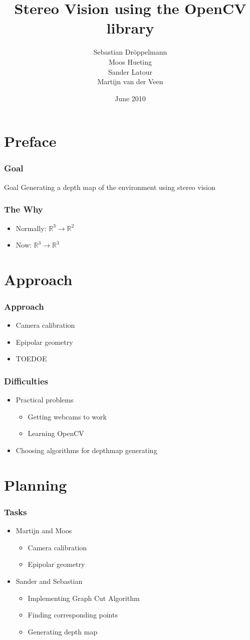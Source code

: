 \documentclass{beamer}
\title[Stereo vision]{Stereo Vision using the OpenCV library}
\author[Dr\"oppelmann \and Hueting \and Latour \and \\Van der Veen]{Sebastian Dr\"oppelmann \\ Moos Hueting \\ Sander Latour \\ Martijn van der Veen}
\institute{University of Amsterdam}
\date{June 2010}
\begin{document}
\frame
{
  \titlepage
}

\section{Preface}

\frame
{
 \frametitle{Goal}
 \begin{block}{Goal}
   Generating a depth map of the environment using stereo vision
 \end{block}
}

\frame
{
  \frametitle{The Why}
  \begin{itemize}
    \item Normally: $\mathbb{R}^3 \rightarrow \mathbb{R}^2$
    \item Now: $\mathbb{R}^3 \rightarrow \mathbb{R}^3$
  \end{itemize}
}

\section{Approach}

\frame
{
  \frametitle{Approach}
  \begin{itemize}
    \item Camera calibration
    \item Epipolar geometry
    \item TOEDOE
  \end{itemize}
}

\frame
{
  \frametitle{Difficulties}
  \begin{itemize}
    \item Practical problems
    \begin{itemize}
      \item Getting webcams to work
      \item Learning OpenCV
    \end{itemize}
    \item Choosing algorithms for depthmap generating
  \end{itemize}
}

\section{Planning}

\frame
{
  \frametitle{Tasks}
  \begin{itemize}
    \item Martijn and Moos
    \begin{itemize}
      \item Camera calibration
      \item Epipolar geometry
    \end{itemize}

    \item Sander and Sebastian
    \begin{itemize}
      \item Implementing Graph Cut Algorithm
      \item Finding corresponding points
      \item Generating depth map
    \end{itemize}
  \end{itemize}
}
\end{document}
